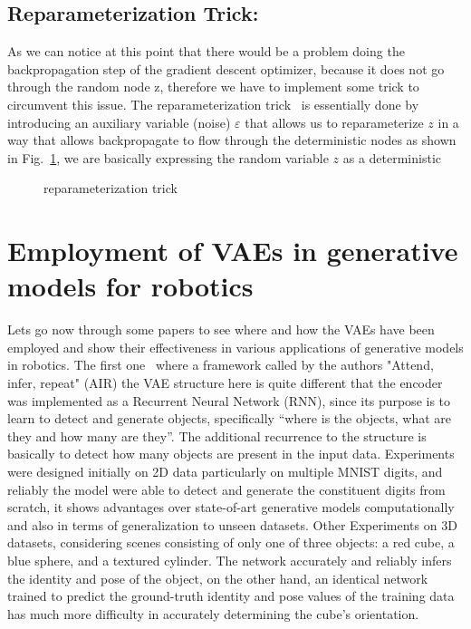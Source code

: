 \subsection{Reparameterization Trick:}
As we can notice at this point that there would be a problem doing the backpropagation step of the gradient descent optimizer, because it does not go through the random node z, therefore we have to implement some trick to circumvent this issue. The reparameterization trick~\cite{kingma2013auto} is essentially done by introducing an auxiliary variable (noise) $\varepsilon$ that allows us to reparameterize $z$ in a way that allows backpropagate to flow through the deterministic nodes as shown in Fig.~\ref{fig:paratrick}, we are basically expressing the random variable $z$ as a deterministic 

\begin{figure}
	\centerline
	\paratrick
	\caption{reparameterization trick}
	\label{fig:paratrick}
\end{figure} 


\section{Employment of VAEs in generative models for robotics}
Lets go now through some papers to see where and how the VAEs have been employed and show their effectiveness in various applications of generative models in robotics. The first one~\cite{eslami2016attend} where a framework called by the authors "Attend, infer, repeat" (AIR) the VAE structure here is quite different that the encoder was implemented as a Recurrent Neural Network (RNN), since its purpose is to learn to detect and generate objects, specifically “where is the objects, what are they and how many are they”. The additional recurrence to the structure is basically to detect how many objects are present in the input data. Experiments were designed initially on 2D data particularly on multiple MNIST digits, and reliably the model were able to detect and generate the constituent digits from scratch, it shows advantages over state-of-art generative models computationally and also in terms of generalization to unseen datasets. Other Experiments on 3D datasets, considering scenes consisting of only one of three objects: a red cube, a blue sphere, and a textured cylinder. The network accurately and reliably infers the identity and pose of the object, on the other hand, an identical network trained to predict the ground-truth identity and pose values of the training data has much more difficulty in accurately determining the cube’s orientation.






\clearpage{\pagestyle{empty}\cleardoublepage}